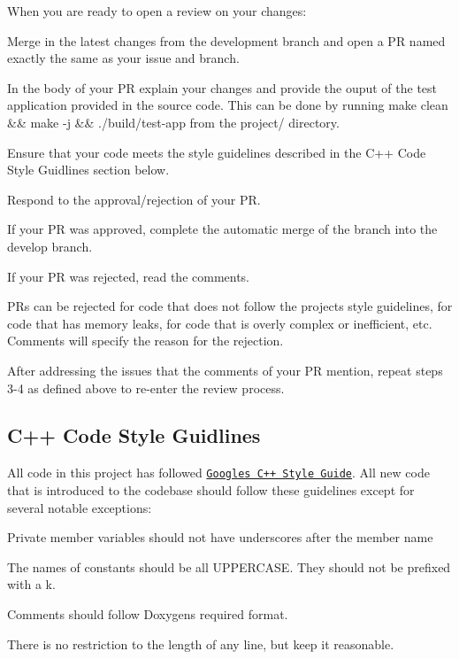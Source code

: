 \begin{DoxyEnumerate}
\begin{DoxyItemize}
\end{DoxyItemize}
\item When you are ready to open a review on your changes\+:
\begin{DoxyItemize}
\item Merge in the latest changes from the {\ttfamily development} branch and open a PR named exactly the same as your issue and branch.
\item In the body of your PR explain your changes and provide the ouput of the test application provided in the source code. This can be done by running {\ttfamily make clean \&\& make -\/j \&\& ./build/test-\/app} from the {\ttfamily project/} directory.
\item Ensure that your code meets the style guidelines described in the {\ttfamily C++ Code Style Guidlines} section below.
\end{DoxyItemize}
\item Respond to the approval/rejection of your PR.
\begin{DoxyItemize}
\item If your PR was approved, complete the automatic merge of the branch into the {\ttfamily develop} branch.
\item If your PR was rejected, read the comments.
\begin{DoxyItemize}
\item P\+Rs can be rejected for code that does not follow the project\textquotesingle{}s style guidelines, for code that has memory leaks, for code that is overly complex or inefficient, etc. Comments will specify the reason for the rejection.
\item After addressing the issues that the comments of your PR mention, repeat steps 3-\/4 as defined above to re-\/enter the review process.
\end{DoxyItemize}
\end{DoxyItemize}
\end{DoxyEnumerate}

\subsection*{C++ Code Style Guidlines}

All code in this project has followed \href{https://google.github.io/styleguide/cppguide.html}{\tt Google\textquotesingle{}s C++ Style Guide}. All new code that is introduced to the codebase should follow these guidelines except for several notable exceptions\+:
\begin{DoxyItemize}
\item Private member variables should not have underscores after the member name
\item The names of constants should be all U\+P\+P\+E\+R\+C\+A\+SE. They should not be prefixed with a {\ttfamily k}.
\item Comments should follow Doxygen\textquotesingle{}s required format.
\item There is no restriction to the length of any line, but keep it reasonable.
\end{DoxyItemize}

